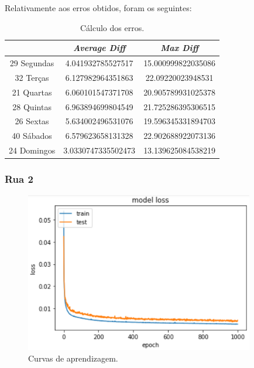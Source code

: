 \documentclass[a4paper, 12pt]{article}
\begin{document}
Relativamente aos erros obtidos, foram os seguintes:

\begin{table}[H]
	\centering
	\begin{tabular}{||c||c|c||}
		\hline\hline
		& \textit{Average Diff} & \textit{Max Diff} \\
		\hline\hline
		29 Segundas & 4.041932785527517
 & 15.000999822035086 \\
		\hline
		32 Terças  &

6.127982964351863 & 22.09220023948531\\
		\hline
		21 Quartas & 6.060101547371708
 & 20.905789931025378	\\
		\hline
		28 Quintas  & 
6.963894699804549
 & 21.725286395306515	\\
		\hline
		26 Sextas & 5.634002496531076
 & 19.596345331894703 \\
		\hline
		40 Sábados  & 6.579623658131328
 & 22.902688922073136 \\
		\hline
		24 Domingos & 3.0330747335502473
 & 13.139625084538219

\\
		\hline\hline
	\end{tabular}
	\label{table:mod1_rua4}
	\caption{Cálculo dos erros.}
\end{table}



\subsubsection{Rua 2}



\begin{figure}[H]
	\centering
	\includegraphics[width=10cm]{resultados/curvas_aprend_2.png}
	\caption{Curvas de aprendizagem.}
\end{figure}
\end{document}
